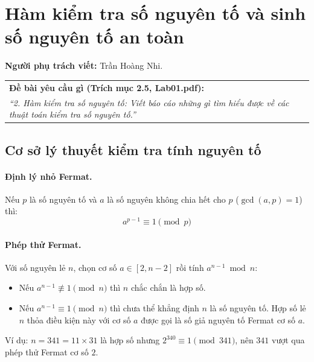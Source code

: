 ﻿\section{Hàm kiểm tra số nguyên tố và sinh số nguyên tố an toàn}
\label{sec:kiem-tra-nguyen-to}

\noindent\textbf{Người phụ trách viết:} Trần Hoàng Nhi.

\begin{table}[h!]
\centering
\begin{tabular}{|p{14.5cm}|}
\hline
\textbf{Đề bài yêu cầu gì (Trích mục 2.5, Lab01.pdf):} \\
\textit{``2. Hàm kiểm tra số nguyên tố: Viết báo cáo những gì tìm hiểu được về các thuật toán kiểm tra số nguyên tố.''} \\
\hline
\end{tabular}
\end{table}


\subsection{Cơ sở lý thuyết kiểm tra tính nguyên tố}

\paragraph{Định lý nhỏ Fermat.} Nếu $p$ là số nguyên tố và $a$ là số nguyên không chia hết cho $p$ ($\gcd(a, p) = 1$) thì:
\begin{equation}
a^{p-1} \equiv 1 \pmod p
\end{equation}

\paragraph{Phép thử Fermat.} Với số nguyên lẻ $n$, chọn cơ số $a \in [2, n - 2]$ rồi tính $a^{n-1} \bmod n$:
\begin{itemize}
    \item Nếu $a^{n-1} \not\equiv 1 \pmod n$ thì $n$ chắc chắn là hợp số.
    \item Nếu $a^{n-1} \equiv 1 \pmod n$ thì chưa thể khẳng định $n$ là số nguyên tố. Hợp số lẻ $n$ thỏa điều kiện này với cơ số $a$ được gọi là số giả nguyên tố Fermat cơ số $a$.
\end{itemize}
Ví dụ: $n = 341 = 11 \times 31$ là hợp số nhưng $2^{340} \equiv 1 \pmod{341}$, nên $341$ vượt qua phép thử Fermat cơ số $2$.


